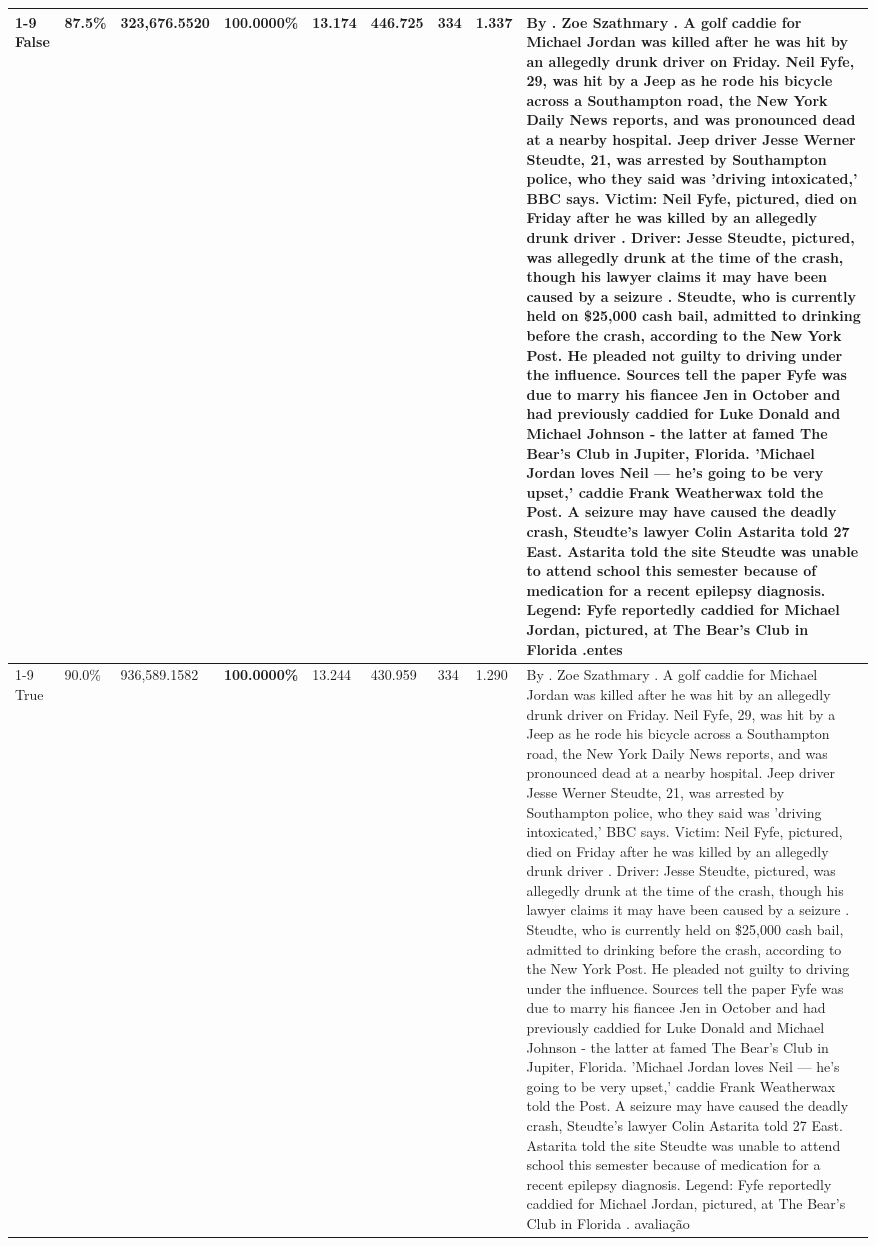 \begin{table}[H]
\begin{tabular}{lllrlllll}
\cline{1-9}
False & 87.5\% & 323,676.5520 & \bfseries \color{red} 100.0000\% & 13.174 & 446.725 & 334 & 1.337 & By . Zoe Szathmary . A golf caddie for Michael Jordan was killed after he was hit by an allegedly drunk driver on Friday. Neil Fyfe, 29, was hit by a Jeep as he rode his bicycle across a Southampton road, the New York Daily News reports, and was pronounced dead at a nearby hospital. Jeep driver Jesse Werner Steudte, 21, was arrested by Southampton police, who they said was 'driving intoxicated,' BBC says. Victim: Neil Fyfe, pictured, died on Friday after he was killed by an allegedly drunk driver . Driver: Jesse Steudte, pictured, was allegedly drunk at the time of the crash, though his lawyer claims it may have been caused by a seizure . Steudte, who is currently held on \$25,000 cash bail, admitted to drinking before the crash, according to the New York Post. He pleaded not guilty to driving under the influence. Sources tell the paper Fyfe was due to marry his fiancee Jen in October and had previously caddied for Luke Donald and Michael Johnson - the latter at famed The Bear's Club in Jupiter, Florida. 'Michael Jordan loves Neil — he’s going to be very upset,' caddie Frank Weatherwax told the Post. A seizure may have caused the deadly crash, Steudte's lawyer Colin Astarita told 27 East. Astarita told the site Steudte was unable to attend school this semester because of medication for a recent epilepsy diagnosis. Legend: Fyfe reportedly caddied for Michael Jordan, pictured, at The Bear's Club in Florida .entes \\
\cline{1-9}
True & 90.0\% & 936,589.1582 & \bfseries \color{red} 100.0000\% & 13.244 & 430.959 & 334 & 1.290 & By . Zoe Szathmary . A golf caddie for Michael Jordan was killed after he was hit by an allegedly drunk driver on Friday. Neil Fyfe, 29, was hit by a Jeep as he rode his bicycle across a Southampton road, the New York Daily News reports, and was pronounced dead at a nearby hospital. Jeep driver Jesse Werner Steudte, 21, was arrested by Southampton police, who they said was 'driving intoxicated,' BBC says. Victim: Neil Fyfe, pictured, died on Friday after he was killed by an allegedly drunk driver . Driver: Jesse Steudte, pictured, was allegedly drunk at the time of the crash, though his lawyer claims it may have been caused by a seizure . Steudte, who is currently held on \$25,000 cash bail, admitted to drinking before the crash, according to the New York Post. He pleaded not guilty to driving under the influence. Sources tell the paper Fyfe was due to marry his fiancee Jen in October and had previously caddied for Luke Donald and Michael Johnson - the latter at famed The Bear's Club in Jupiter, Florida. 'Michael Jordan loves Neil — he’s going to be very upset,' caddie Frank Weatherwax told the Post. A seizure may have caused the deadly crash, Steudte's lawyer Colin Astarita told 27 East. Astarita told the site Steudte was unable to attend school this semester because of medication for a recent epilepsy diagnosis. Legend: Fyfe reportedly caddied for Michael Jordan, pictured, at The Bear's Club in Florida . avaliação \\

\end{tabular}
\end{table}
